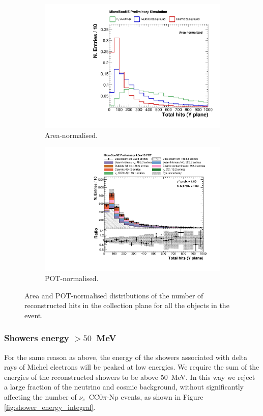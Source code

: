 \begin{figure}[htbp]
\centering
  \begin{subfigure}{0.49\textwidth}
    \includegraphics[width=\linewidth]{figures/h_total_hits_y_norm.pdf}
    \caption{Area-normalised.} \label{fig:nhits_integral}
  \end{subfigure}
    \begin{subfigure}{0.49\textwidth}
    \includegraphics[width=\linewidth]{figures/h_total_hits_y.pdf}
    \caption{POT-normalised.} \label{fig:nhits_pot}
  \end{subfigure}
  \caption{Area and POT-normalised distributions of the number of reconstructed hits in the collection plane for all the objects in the event.}
\end{figure}


\subsubsection*{Showers energy $>50$~MeV} 
For the same reason as above, the energy of the showers associated with delta rays of Michel electrons will be peaked at low energies. We require the sum of the energies of the reconstructed showers to be above 50~MeV. In this way we reject a large fraction of the neutrino and cosmic background, without significantly affecting the number of $\nu_e$~CC0$\pi$-Np events, as shown in Figure \ref{fig:shower_energy_integral}.


